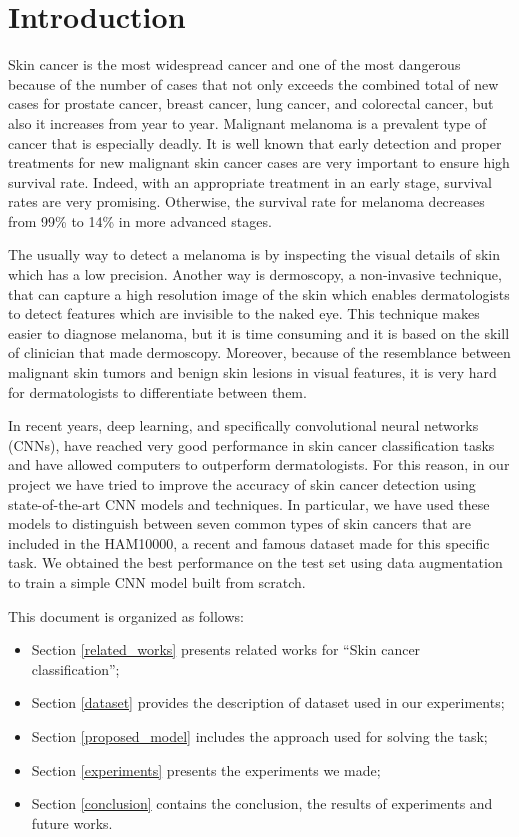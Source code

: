 \section{Introduction}

	Skin cancer is the most widespread cancer and one of the most dangerous because of the number of cases that not only exceeds the combined total of new cases for prostate cancer, breast cancer, lung cancer, and colorectal cancer, but also it increases from year to year. Malignant melanoma is a prevalent type of cancer that is especially deadly. It is well known that early detection and proper treatments for new malignant skin cancer cases are very important to ensure high survival rate. Indeed, with an appropriate treatment in an early stage, survival rates are very promising. Otherwise, the survival rate for melanoma decreases from 99\% to 14\% in more advanced stages.
	
	\smallskip
	
	The usually way to detect a melanoma is by inspecting the visual details of skin which has a low precision. Another way is dermoscopy, a non-invasive technique, that can capture a high resolution image of the skin which enables dermatologists to detect features which are invisible to the naked eye. This technique makes easier to diagnose melanoma, but it is time consuming and it is based on the skill of clinician that made dermoscopy. Moreover, because of the resemblance between malignant skin tumors and benign skin lesions in visual features, it is very hard for dermatologists to differentiate between them.
	
	\smallskip
	
	In recent years, deep learning, and specifically convolutional neural networks (CNNs), have reached very good performance in skin cancer classification tasks and have allowed computers to outperform dermatologists. For this reason, in our project we have tried to improve the accuracy of skin cancer detection using state-of-the-art CNN models and techniques. In particular, we have used these models to distinguish between seven common types of skin cancers that are included in the HAM10000, a recent and famous dataset made for this specific task. We obtained the best performance on the test set using data augmentation to train a simple CNN model built from scratch. 
	
	\bigskip
	
	This document is organized as follows:  
	\begin{itemize}
		\item Section \ref{related_works} presents related works for ``Skin cancer classification'';
		\item Section \ref{dataset} provides the description of dataset used in our experiments;
		\item Section \ref{proposed_model} includes the approach used for solving the task;
		\item Section \ref{experiments} presents the experiments we made;
		\item Section \ref{conclusion} contains the conclusion, the results of experiments and future works.
	\end{itemize}
	


	